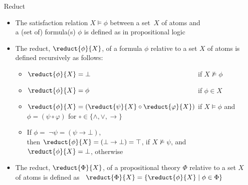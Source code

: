 \begin{frame}{Reduct}
  \begin{itemize}
  \item<1->
    The satisfaction relation $X\models \phi$ between a set~$X$ of atoms and\\
    a (set of) formula(s) $\phi$ is defined as in propositional logic
  \item<2->
    The \alert{reduct}, $\reduct{\phi}{X}$, of a formula $\phi$ relative to a set $X$ of atoms
    \pause[3]%
    is defined recursively as follows:
    \begin{itemize}
    \item <3-> %
      $\reduct{\phi}{X}=\rlap{$\bot$}\phantom{(\reduct{\psi}{X} \circ \reduct{\varphi}{X})}$
      \quad
      if  $X\not\models \phi$
    \item <4-> %
      $\reduct{\phi}{X}=\rlap{$\phi$}\phantom{(\reduct{\psi}{X} \circ \reduct{\varphi}{X})}$
      \quad
      if  $\phi\in X$
    \item <5-> $\reduct{\phi}{X}=(\reduct{\psi}{X} \circ \reduct{\varphi}{X})$
      \quad
      if  $X\models \phi$
      and  $\phi=(\psi\circ\varphi)$ for $\circ\in\{\wedge,\vee,\rightarrow\}$
      \medskip
    \item <6->
      If $\phi=\;{\neg \psi}=(\psi\rightarrow\bot)$,\\
      then $\reduct{\phi}{X}=(\bot\rightarrow\bot)=\top$, if $X\not\models \psi$,
      and $\reduct{\phi}{X}=\bot$, otherwise
    \end{itemize}
    \medskip
  \item <7->
    The \alert{reduct}, $\reduct{\Phi}{X}$, of a propositional theory $\Phi$ relative to
    a set $X$ of atoms is defined as
    \
    \(
    \reduct{\Phi}{X}
    =
    \{\reduct{\phi}{X} \mid \phi\in \Phi\}
    \)
  \end{itemize}
\end{frame}
